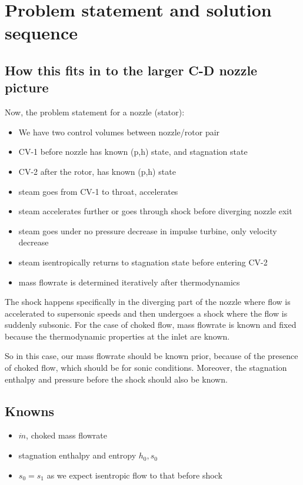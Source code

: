 \documentclass[masters]{ucbthesis}
\renewcommand{\_}{\kern-1.5pt\textunderscore\kern-1.5pt}
\begin{document}
\chapter{Problem statement and solution sequence}

\section{How this fits in to the larger C-D nozzle picture}

Now, the problem statement for a nozzle (stator):
\begin{itemize}
	\item We have two control volumes between nozzle/rotor pair
	\item CV-1 before nozzle has known (p,h) state, and stagnation state 
	\item CV-2 after the rotor, has known (p,h) state
	\item steam goes from CV-1 to throat, accelerates 
	\item steam accelerates further or goes through shock before diverging nozzle exit 
	\item steam goes under no pressure decrease in impulse turbine, only velocity decrease 
	\item steam isentropically returns to stagnation state before entering CV-2
	\item mass flowrate is determined iteratively after thermodynamics
\end{itemize}

The shock happens specifically in the diverging part of the nozzle where 
flow is accelerated to supersonic speeds and then undergoes a shock where 
the flow is suddenly subsonic. For the case of choked flow, mass 
flowrate is known and fixed because the thermodynamic properties at 
the inlet are known.

So in this case, our mass flowrate should be known prior, because of 
the presence of choked flow, which should be for sonic conditions. Moreover,
the stagnation enthalpy and pressure before the shock should also be known.

\section{Knowns}
\begin{itemize}
	\item $\dot{m}$, choked mass flowrate
	\item stagnation enthalpy and entropy $h_0, s_0$
	\item $s_0 = s_1$ as we expect isentropic flow to that before shock
\end{itemize}
\end{document}
